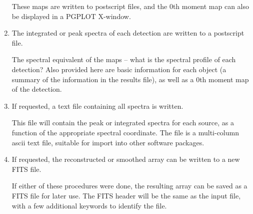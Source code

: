 \begin{enumerate}
  These maps are written to postscript files, and the 0th moment map
  can also be displayed in a PGPLOT X-window.

\item The integrated or peak spectra of each detection are written to a
  postscript file. 

  The spectral equivalent of the maps -- what is the spectral profile
  of each detection? Also provided here are basic information for each
  object (a summary of the information in the results file), as well
  as a 0th moment map of the detection.

\item If requested, a text file containing all spectra is written.

  This file will contain the peak or integrated spectra for each
  source, as a function of the appropriate spectral coordinate. The
  file is a multi-column ascii text file, suitable for import into
  other software packages. 

\item If requested, the reconstructed or smoothed array can be written
  to a new FITS file.

  If either of these procedures were done, the resulting array can be
  saved as a FITS file for later use. The FITS header will be the same
  as the input file, with a few additional keywords to identify the
  file. 

\end{enumerate}

